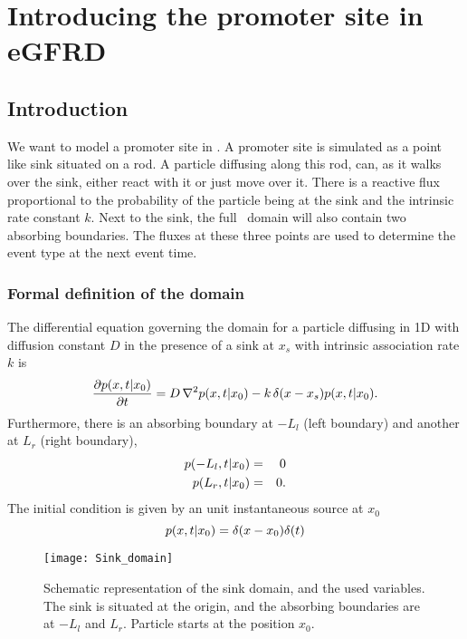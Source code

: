 \section{Introducing the promoter site in eGFRD}


\subsection{Introduction}

We want to model a promoter site in \GFRD. A promoter site is simulated as a point like sink situated on a rod. A particle diffusing along this rod, can, as it walks over the sink, either react with it or just move over it. There is a reactive flux proportional to the probability of the particle being at the sink and the intrinsic rate constant $k$. Next to the sink, the full \GFRD\, domain will also contain two absorbing boundaries. The fluxes at these three points are used to determine the event type at the next event time.

\subsubsection{Formal definition of the domain}

The differential equation governing the domain for a particle diffusing in 1D with diffusion constant $D$ in the presence of a sink at $x_s$ with intrinsic association rate $k$ is
\begin{equation}
 \frac{\partial p(x,t|x_0)}{\partial t} = D \, \nabla ^2 p(x,t|x_0) - k \, \delta (x - x_s) p(x,t|x_0).
 \elabel{DE_I}
\end{equation}
Furthermore, there is an absorbing boundary at $-L_l$ (left boundary) and another at $L_r$ (right boundary),
\begin{eqnarray}
 p(-L_l,t|x_0) & = & 0 \\
 p(L_r,t|x_0) & = & 0.
\elabel{BC_I}
\end{eqnarray}
The initial condition is given by an unit instantaneous source at $x_0$
\begin{equation}
 p(x,t|x_0) = \delta(x-x_0)\delta(t)
\elabel{IC_I}
\end{equation}

\begin{figure}[bh]
\centering
\texttt{[image: Sink\_domain]}
\caption{ Schematic representation of the sink domain, and the used variables. The sink is situated at the origin, and the absorbing boundaries are at $-L_l$ and $L_r$. Particle starts at the position $x_0$.}
\end{figure}



